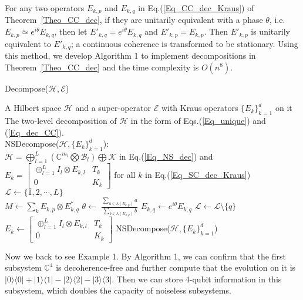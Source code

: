 \documentclass[journal]{IEEEtran}
\def\h{\ensuremath{\mathcal{H}}}
\def\l{\ensuremath{\mathcal{L}}}
\def\k{\ensuremath{\mathcal{K}}}
\def\b{\ensuremath{\mathcal{B}}}
\def\e{\ensuremath{\mathcal{E}}}
\def\l{\ensuremath{\mathcal{L}}}
\def\l{\mathcal{L}}
\def\k{\mathcal{K}}
\begin{document}
For any two operators $E_{k,p}$ and $E_{k,q}$ in Eq.(\ref{Eq_CC_dec_Kraus}) of Theorem~\ref{Theo_CC_dec}, if they are unitarily equivalent with a phase $\theta$, i.e. $E_{k,p}\simeq e^{i\theta}E_{k,q}$, then 
 let $E'_{k,q}=e^{i\theta}E_{k,q}$ and $E'_{k,p}=E_{k,p}$. Then $E'_{k,p}$ is unitarily equivalent to $E'_{k,q}$; a continuous coherence is transformed to be stationary. Using this method, we develop Algorithm 1 to implement decompositions in Theorem~\ref{Theo_CC_dec} and the time complexity is $O(n^8)$. 
 \begin{algorithm}
\caption{Decompose($\h,\e$)}
\label{Irreducibility}
\begin{algorithmic}
\REQUIRE A Hilbert space $\h$ and a super-operator $\e$ with Kraus operators $\{E_{k}\}_{k=1}^{d}$ on it \\
\ENSURE The two-level decomposition of $\h$ in the form of Eqs.(\ref{Eq_unique}) and (\ref{Eq_dec_CC}). \\

\STATE NSDecompose($\h,\{E_k\}_{k=1}^d$):\\
     $\h=\bigoplus_{l=1}^{L}(\mathbb{C}^{m_l}\bigotimes \b_l)\bigoplus \k$ in Eq.(\ref{Eq_NS_dec}) and $E_k=\left[\begin{matrix}
  \oplus_{l=1}^{L} I_{l}\otimes E_{k,l} & T_k\\
0&K_k
\end{matrix}\right]$ for all $k$
   in Eq.(\ref{Eq_SC_dec_Kraus})\\

\STATE $\l\leftarrow \{1,2,\cdots,L\}$\\
\IF{$p\in \l$}
\FOR{each $q>p$ and $q\in \l$}
\STATE$M\leftarrow\sum_{k}E_{k,p}\otimes E_{k,q}^{*}$
\STATE $\theta\leftarrow$ $\frac{\sum_{a\in\lambda(E_{k,p})}a}{\sum_{b\in\lambda(E_{k,q})}b}$  
\STATE $E_{k,q}\leftarrow e^{i\theta}E_{k,q}$
\STATE $\l\leftarrow \l\setminus\{q\}$
\ENDIF
\ENDFOR
\ENDIF
\ENDFOR
{}
\STATE $E_k\leftarrow\left[\begin{matrix}
  \oplus_{l=1}^{L} I_{l}\otimes E_{k,l} & T_k\\
0&K_k
\end{matrix}\right]$ 
\ENDFOR
\RETURN NSDecompose($\h,\{E_{k}\}_{k=1}^d$)
\end{algorithmic}
\end{algorithm}

Now we back to see Example 1. By Algorithm 1, we can confirm that the first subsystem $\mathbb{C}^4$ is decoherence-free and further compute that the evolution on it is $|0\rangle\langle0|+|1\rangle\langle1|-|2\rangle\langle2|-|3\rangle\langle3|$. Then we can store 4-qubit information in this subsystem, which doubles the capacity of  noiseless subsystems.  
\end{document}

